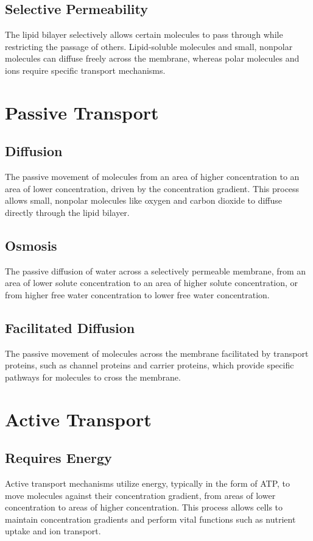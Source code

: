 \documentclass{article}
\begin{document}
\subsection{Selective Permeability}
The lipid bilayer selectively allows certain molecules to pass through while restricting the passage of others. Lipid-soluble molecules and small, nonpolar molecules can diffuse freely across the membrane, whereas polar molecules and ions require specific transport mechanisms.

\section{Passive Transport}

\subsection{Diffusion}
The passive movement of molecules from an area of higher concentration to an area of lower concentration, driven by the concentration gradient. This process allows small, nonpolar molecules like oxygen and carbon dioxide to diffuse directly through the lipid bilayer.

\subsection{Osmosis}
The passive diffusion of water across a selectively permeable membrane, from an area of lower solute concentration to an area of higher solute concentration, or from higher free water concentration to lower free water concentration.

\subsection{Facilitated Diffusion}
The passive movement of molecules across the membrane facilitated by transport proteins, such as channel proteins and carrier proteins, which provide specific pathways for molecules to cross the membrane.

\section{Active Transport}

\subsection{Requires Energy}
Active transport mechanisms utilize energy, typically in the form of ATP, to move molecules against their concentration gradient, from areas of lower concentration to areas of higher concentration. This process allows cells to maintain concentration gradients and perform vital functions such as nutrient uptake and ion transport.
\end{document}
